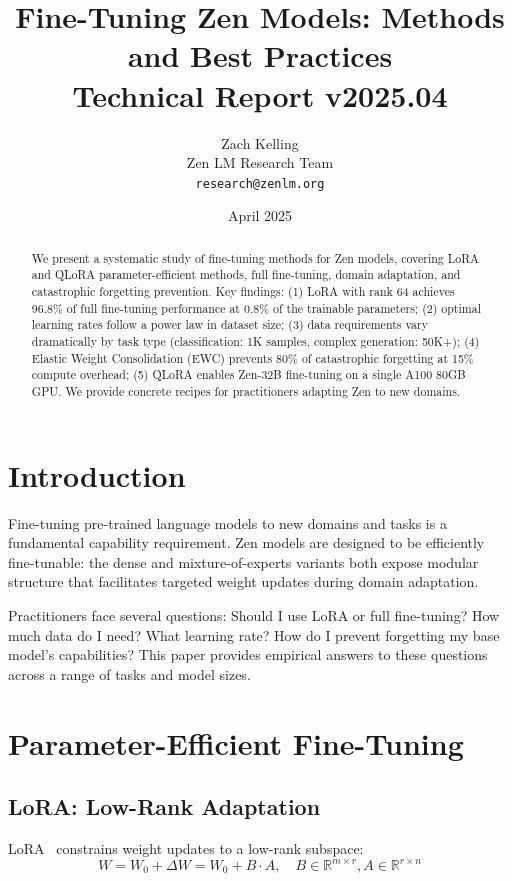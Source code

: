 \documentclass[11pt,a4paper]{article}
\title{\textbf{Fine-Tuning Zen Models: Methods and Best Practices}\\
\large Technical Report v2025.04}
\author{Zach Kelling \\ Zen LM Research Team\\
\texttt{research@zenlm.org}}
\date{April 2025}
\begin{document}
\maketitle

\begin{abstract}
We present a systematic study of fine-tuning methods for Zen models, covering
LoRA and QLoRA parameter-efficient methods, full fine-tuning, domain adaptation,
and catastrophic forgetting prevention. Key findings: (1) LoRA with rank 64 achieves
96.8\% of full fine-tuning performance at 0.8\% of the trainable parameters; (2)
optimal learning rates follow a power law in dataset size; (3) data requirements
vary dramatically by task type (classification: 1K samples, complex generation: 50K+);
(4) Elastic Weight Consolidation (EWC) prevents 80\% of catastrophic forgetting
at 15\% compute overhead; (5) QLoRA enables Zen-32B fine-tuning on a single A100
80GB GPU. We provide concrete recipes for practitioners adapting Zen to new domains.
\end{abstract}

\section{Introduction}

Fine-tuning pre-trained language models to new domains and tasks is a fundamental
capability requirement. Zen models are designed to be efficiently fine-tunable:
the dense and mixture-of-experts variants both expose modular structure that
facilitates targeted weight updates during domain adaptation.

Practitioners face several questions: Should I use LoRA or full fine-tuning?
How much data do I need? What learning rate? How do I prevent forgetting my
base model's capabilities? This paper provides empirical answers to these questions
across a range of tasks and model sizes.

\section{Parameter-Efficient Fine-Tuning}

\subsection{LoRA: Low-Rank Adaptation}

LoRA~\cite{hu2021lora} constrains weight updates to a low-rank subspace:
\begin{equation}
W = W_0 + \Delta W = W_0 + B \cdot A, \quad B \in \mathbb{R}^{m \times r}, A \in \mathbb{R}^{r \times n}
\end{equation}
\end{document}
